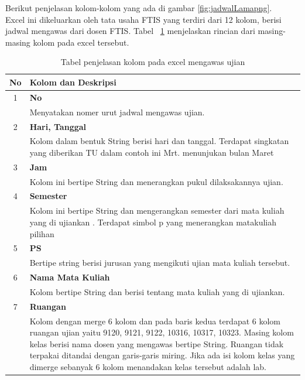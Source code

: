 Berikut penjelasan kolom-kolom yang ada di gambar \ref{fig:jadwalLamapng}.\\
Excel ini dikeluarkan oleh tata usaha FTIS yang terdiri dari 12 kolom, berisi jadwal mengawas dari dosen FTIS.
Tabel ~\ref{tab:penjelasan_kolom} menjelaskan rincian dari masing-masing kolom pada excel tersebut. 
\begin{table}[H]
		\centering
		\caption{Tabel penjelasan kolom pada excel mengawas ujian}
		\label{tab:penjelasan_kolom}
\begin{tabular}{|c|p{12cm}|}
		\hline
		\textbf{No} & \textbf{Kolom dan Deskripsi} \\ \hline \hline
		1 & \textbf{No}\\
			&	Menyatakan nomer urut jadwal mengawas ujian.\\ \hline
		2 & \textbf{Hari, Tanggal}\\
			&	Kolom dalam bentuk String berisi hari dan tanggal. Terdapat singkatan yang diberikan TU dalam contoh ini  Mrt. menunjukan bulan Maret\\ \hline	
		3 & \textbf{Jam}\\
			&	Kolom ini bertipe String dan menerangkan pukul dilaksakannya ujian.\\ \hline
		4 & \textbf{Semester}\\
			&	Kolom ini bertipe String dan mengerangkan semester dari mata kuliah yang di ujiankan . Terdapat simbol p yang menerangkan matakuliah pilihan\\ \hline
		5 & \textbf{PS}\\
			&	Bertipe string berisi jurusan yang mengikuti ujian mata kuliah tersebut.\\ \hline
		6 & \textbf{Nama Mata Kuliah}\\
			&	Kolom bertipe String dan berisi tentang mata kuliah yang di ujiankan.\\ \hline
		7 & \textbf{Ruangan}\\
			&	Kolom dengan merge 6 kolom dan pada baris kedua terdapat 6 kolom ruangan ujian yaitu 9120, 9121, 9122, 10316, 10317, 10323. Masing kolom kelas berisi nama dosen yang mengawas bertipe String. Ruangan tidak terpakai ditandai dengan garis-garis miring. Jika ada isi kolom kelas yang dimerge sebanyak 6 kolom menandakan kelas tersebut adalah lab.\\ \hline
	\end{tabular}	
\end{table}

